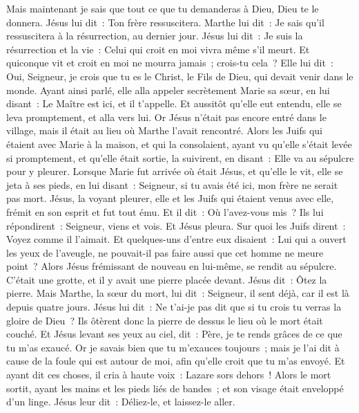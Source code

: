 \begin{multicols}{2}
Mais maintenant je sais que tout ce que tu demanderas à Dieu, Dieu te le donnera.
Jésus lui dit~: Ton frère ressuscitera.
Marthe lui dit~: Je sais qu'il ressuscitera à la résurrection, au dernier jour.
Jésus lui dit~: Je suis la résurrection et la vie~: Celui qui croit en moi vivra même s'il meurt.
Et quiconque vit et croit en moi ne mourra jamais~; crois-tu cela~?
Elle lui dit~: Oui, Seigneur, je crois que tu es le Christ, le Fils de Dieu, qui devait venir dans le monde.
Ayant ainsi parlé, elle alla appeler secrètement Marie sa sœur, en lui disant~: Le Maître est ici, et il t'appelle.
Et aussitôt qu'elle eut entendu, elle se leva promptement, et alla vers lui.
Or Jésus n'était pas encore entré dans le village, mais il était au lieu où Marthe l'avait rencontré.
Alors les Juifs qui étaient avec Marie à la maison, et qui la consolaient, ayant vu qu'elle s'était levée si promptement, et qu'elle était sortie, la suivirent, en disant~: Elle va au sépulcre pour y pleurer.
Lorsque Marie fut arrivée où était Jésus, et qu'elle le vit, elle se jeta à ses pieds, en lui disant~: Seigneur, si tu avais été ici, mon frère ne serait pas mort.
Jésus, la voyant pleurer, elle et les Juifs qui étaient venus avec elle, frémit en son esprit et fut tout ému.
Et il dit~: Où l'avez-vous mis~? Ils lui répondirent~: Seigneur, viens et vois.
Et Jésus pleura.
Sur quoi les Juifs dirent~: Voyez comme il l'aimait.
Et quelques-uns d'entre eux disaient~: Lui qui a ouvert les yeux de l'aveugle, ne pouvait-il pas faire aussi que cet homme ne meure point~?
Alors Jésus frémissant de nouveau en lui-même, se rendit au sépulcre. C'était une grotte, et il y avait une pierre placée devant.
Jésus dit~: Ôtez la pierre. Mais Marthe, la sœur du mort, lui dit~: Seigneur, il sent déjà, car il est là depuis quatre jours.
Jésus lui dit~: Ne t'ai-je pas dit que si tu crois tu verras la gloire de Dieu~?
Ils ôtèrent donc la pierre de dessus le lieu où le mort était couché. Et Jésus levant ses yeux au ciel, dit~: Père, je te rends grâces de ce que tu m'as exaucé.
Or je savais bien que tu m'exauces toujours~; mais je l'ai dit à cause de la foule qui est autour de moi, afin qu'elle croit que tu m'as envoyé.
Et ayant dit ces choses, il cria à haute voix~: Lazare sors dehors~!
Alors le mort sortit, ayant les mains et les pieds liés de bandes~; et son visage était enveloppé d'un linge. Jésus leur dit~: Déliez-le, et laissez-le aller.

\end{multicols}
